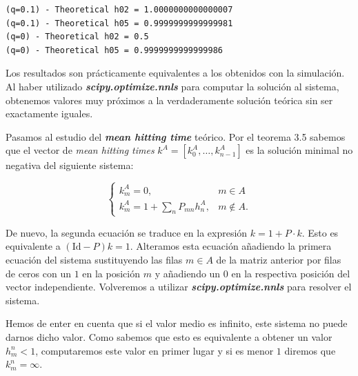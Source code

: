 \documentclass[11pt]{article}
\theoremstyle{plain}
\begin{document}
    \begin{Verbatim}[commandchars=\\\{\}]
(q=0.1) - Theoretical h02 = 1.0000000000000007
(q=0.1) - Theoretical h05 = 0.9999999999999981
(q=0) - Theoretical h02 = 0.5
(q=0) - Theoretical h05 = 0.9999999999999986
    \end{Verbatim}

    Los resultados son prácticamente equivalentes a los obtenidos con la
simulación. Al haber utilizado \textbf{\emph{scipy.optimize.nnls}} para
computar la solución al sistema, obtenemos valores muy próximos a la
verdaderamente solución teórica sin ser exactamente iguales.

Pasamos al estudio del \textbf{\emph{mean hitting time}} teórico. Por el
teorema 3.5 sabemos que el vector de \emph{mean hitting times}
\(k^A = [k_0^A, \ldots, k_{n-1}^A]\) es la solución minimal no negativa
del siguiente sistema:

\[
\begin{cases}
  k_m^{A} = 0, & m \in A\\
  k_m^{A} = 1 + \sum_{n} P_{mn}h_n^{A}, & m \notin A.
\end{cases}
\]

De nuevo, la segunda ecuación se traduce en la expresión
\(k = 1 + P \cdot k\). Esto es equivalente a \((\text{Id} - P)k = 1\).
Alteramos esta ecuación añadiendo la primera ecuación del sistema
sustituyendo las filas \(m \in A\) de la matriz anterior por filas de
ceros con un \(1\) en la posición \(m\) y añadiendo un \(0\) en la
respectiva posición del vector independiente. Volveremos a utilizar
\textbf{\emph{scipy.optimize.nnls}} para resolver el sistema.

Hemos de enter en cuenta que si el valor medio es infinito, este sistema
no puede darnos dicho valor. Como sabemos que esto es equivalente a
obtener un valor \(h_m^n < 1\), computaremos este valor en primer lugar
y si es menor \(1\) diremos que \(k_m^n = \infty\).
\end{document}
